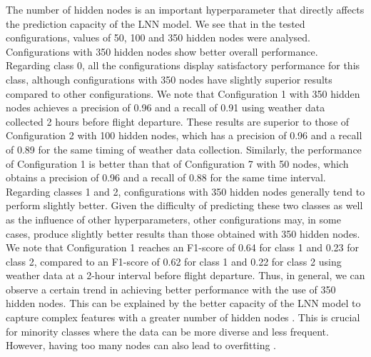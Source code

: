 \documentclass[12pt,oneside]{book} %
\begin{document}
\noindent The number of hidden nodes is an important hyperparameter that directly affects the prediction capacity of the LNN model. We see that in the tested configurations, values of 50, 100 and 350 hidden nodes were analysed. Configurations with 350 hidden nodes show better overall performance. Regarding class 0, all the configurations display satisfactory performance for this class, although configurations with 350 nodes have slightly superior results compared to other configurations. We note that Configuration 1 with 350 hidden nodes achieves a precision of 0.96 and a recall of 0.91 using weather data collected 2 hours before flight departure. These results are superior to those of Configuration 2 with 100 hidden nodes, which has a precision of 0.96 and a recall of 0.89 for the same timing of weather data collection. Similarly, the performance of Configuration 1 is better than that of Configuration 7 with 50 nodes, which obtains a precision of 0.96 and a recall of 0.88 for the same time interval. Regarding classes 1 and 2, configurations with 350 hidden nodes generally tend to perform slightly better. Given the difficulty of predicting these two classes as well as the influence of other hyperparameters, other configurations may, in some cases, produce slightly better results than those obtained with 350 hidden nodes. We note that Configuration 1 reaches an F1-score of 0.64 for class 1 and 0.23 for class 2, compared to an F1-score of 0.62 for class 1 and 0.22 for class 2 using weather data at a 2-hour interval before flight departure. Thus, in general, we can observe a certain trend in achieving better performance with the use of 350 hidden nodes. This can be explained by the better capacity of the LNN model to capture complex features with a greater number of hidden nodes \cite{Hyperparameters1}. This is crucial for minority classes where the data can be more diverse and less frequent. However, having too many nodes can also lead to overfitting \cite{Hyperparameters1}.
\end{document}
